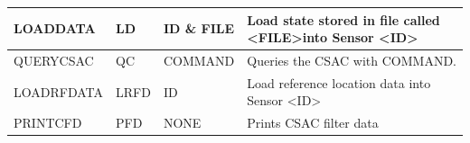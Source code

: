 \documentclass[12pt,english,a4paper]{report}
\begin{document}
\begin{table}
\begin{tabularx}{\textwidth}{|l|l|l|X|}
	  LOADDATA                    & LD                        & ID \& FILE                    & Load state stored in file called \textless FILE\textgreater into Sensor \textless ID\textgreater \\ \hline
	  QUERYCSAC                   & QC                        & COMMAND                       & Queries the CSAC with COMMAND.                                                                 \\ \hline
	  LOADRFDATA                  & LRFD                      & ID                            & Load reference location data into Sensor \textless ID\textgreater                               \\ \hline
	  PRINTCFD                    & PFD                       & NONE                          & Prints CSAC filter data\\ \hline                                                                        
	  \end{tabularx}
\end{table}

\newpage
\end{document}

